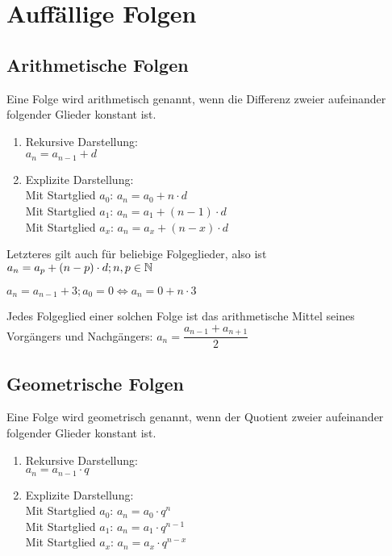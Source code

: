 		\section{Auffällige Folgen}


	\subsection{Arithmetische Folgen}

\begin{Definition}
Eine Folge wird arithmetisch genannt, wenn die Differenz zweier aufeinander folgender Glieder konstant ist.
\begin{enumerate}
\item Rekursive Darstellung:\\
\indent $a_{n}=a_{n-1}+d$
\item Explizite Darstellung:\\
\indent Mit Startglied $a_{0}$: $a_{n}=a_{0}+n\cdot d$\\
\indent Mit Startglied $a_{1}$: $a_{n}=a_{1}+(n-1)\cdot d$\\
\indent Mit Startglied $a_{x}$: $a_{n}=a_{x}+(n-x)\cdot d$
\end{enumerate}
\end{Definition}

\begin{Bemerkung}
Letzteres gilt auch für beliebige Folgeglieder, also ist $a_{n}=a_{p}+(n-p)\cdot d;n,p\in\mathbb{N}$
\end{Bemerkung}

\begin{Beispiel}
$a_{n}=a_{n-1}+3;a_{0}=0\Leftrightarrow a_{n}=0+n\cdot3$
\end{Beispiel}

\begin{Bemerkung}
Jedes Folgeglied einer solchen Folge ist das arithmetische Mittel seines Vorgängers und Nachgängers: $a_{n}=\dfrac{a_{n-1}+a_{n+1}}{2}$
\end{Bemerkung}

	\subsection{Geometrische Folgen}

\begin{Definition}
Eine Folge wird geometrisch genannt, wenn der Quotient zweier aufeinander folgender Glieder konstant ist.
\begin{enumerate}
\item Rekursive Darstellung:\\
\indent $a_{n}=a_{n-1}\cdot q$
\item Explizite Darstellung:\\
\indent Mit Startglied $a_{0}$: $a_{n}=a_{0}\cdot q^n$\\
\indent Mit Startglied $a_{1}$: $a_{n}=a_{1}\cdot q^{n-1}$\\
\indent Mit Startglied $a_{x}$: $a_{n}=a_{x}\cdot q^{n-x}$\\
\end{enumerate}
\end{Definition}

